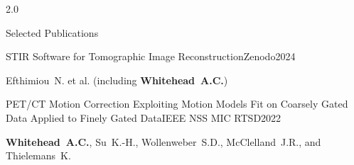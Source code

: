 \documentclass{cv}
\begin{document}
\begin{spacing}{2.0}
\begin{rSection}{Selected Publications}
            \vspace{-0.5cm}
            \item \begin{rSubsection}{STIR Software for Tomographic Image Reconstruction}{}{Zenodo}{2024}
                \vspace{-0.25cm}
                \item Efthimiou~N. et al. (including \textbf{Whitehead~A.C.})
            \end{rSubsection}
    
            \vspace{-0.5cm}
            \item \begin{rSubsection}{PET/CT Motion Correction Exploiting Motion Models Fit on Coarsely Gated Data Applied to Finely Gated Data}{}{IEEE NSS MIC RTSD}{2022}
                \vspace{-0.25cm}
                \item \textbf{Whitehead~A.C.}, Su~K.-H., Wollenweber~S.D., McClelland~J.R., and Thielemans~K.
            \end{rSubsection}
        \end{rSection}
    \end{spacing}

    \newpage
    
\end{document}
